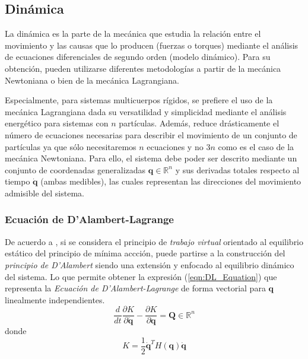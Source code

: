 \subsection{Dinámica}
    \noindent La dinámica es la parte de la mecánica que estudia la relación entre el movimiento y las causas que lo producen
    (fuerzas o torques) mediante el análisis de ecuaciones diferenciales de segundo orden (modelo dinámico). Para su
    obtención, pueden utilizarse diferentes metodologías a partir de la mecánica Newtoniana o bien de la mecánica
    Lagrangiana. 
    
    Especialmente, para sistemas multicuerpos rígidos, se prefiere el uso de la mecánica Lagrangiana dada su versatilidad
    y simplicidad mediante el análisis energético para sistemas con $n$ partículas. Además, reduce drásticamente el número de ecuaciones
    necesarias para describir el movimiento de un conjunto de partículas ya que sólo necesitaremos $n$ ecuaciones y no $3n$ como es el caso 
    de la mecánica Newtoniana.    
    Para ello, el sistema debe poder ser descrito mediante un conjunto de coordenadas generalizadas $\boldsymbol{q} \in \mathbb{R}^n$ y sus 
    derivadas totales respecto al tiempo $\boldsymbol{\dot{q}}$ (ambas medibles), las cuales representan las direcciones del movimiento
    admisible del sistema. 
    
    \subsubsection{Ecuación de D'Alambert-Lagrange}
    \noindent De acuerdo a \cite{3DMotion}, si se considera el principio de \emph{trabajo virtual} orientado al equilibrio estático del principio de mínima accción, puede partirse a la
    construcción del \emph{principio de D'Alambert} siendo una extensión y enfocado al equilibrio dinámico del sistema.  Lo que permite obtener la
    expresión (\ref{eqn:DL_Equation}) que representa la \emph{Ecuación de D'Alambert-Lagrange} de forma vectorial para $\boldsymbol{q}$ linealmente
    independientes.
    \begin{equation} 
        \label{eqn:DL_Equation}
         \frac{d}{dt} \frac{\partial K}{\partial \boldsymbol{\dot{q}}} - \frac{\partial K}{\partial \boldsymbol{q}} = \boldsymbol{Q}
         \in \mathbb{R}^n
    \end{equation}
    donde
    \begin{equation}
        \label{eqn:kinetic_energy}
         K = \frac{1}{2} \boldsymbol{\dot{q}}^T H(\boldsymbol{q}) \boldsymbol{\dot{q}}
    \end{equation}

